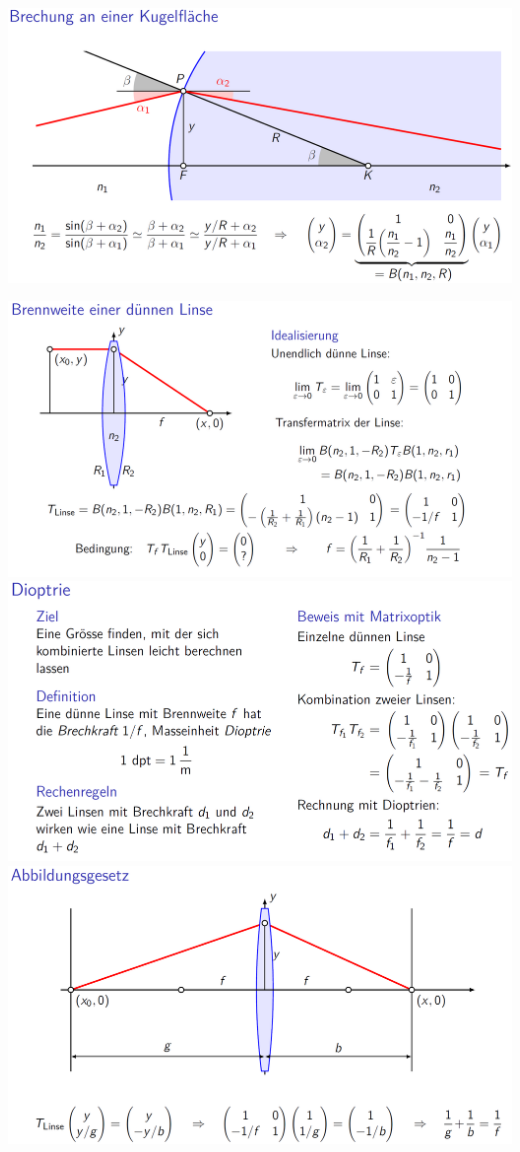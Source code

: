 		 \vspace{0.5cm}
		 
		 \includegraphics[width=0.85\linewidth]{Bilder/matrixoptik2} \\
		 
		 \vfill\null
		 \columnbreak
		 
		 \includegraphics[width=0.8\linewidth]{Bilder/matrixoptik3} \\
		 
		 \includegraphics[width=0.8\linewidth]{Bilder/matrixoptik4} \\
		 
		 \includegraphics[width=0.8\linewidth]{Bilder/matrixoptik5}\\
		 

